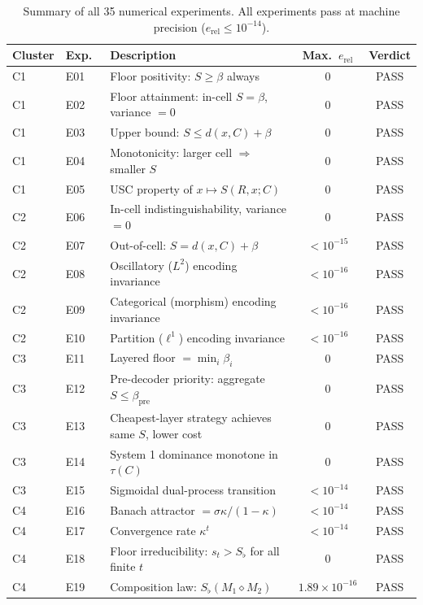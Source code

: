 \documentclass[twocolumn,11pt,a4paper]{article}
\newcommand{\Sfloor}{S_{\flat}}
\newcommand{\Compose}{\diamond}
\begin{document}
\begin{table}[!htbp]
\centering
\caption{Summary of all 35 numerical experiments.  All experiments
pass at machine precision ($e_{\mathrm{rel}}\leq 10^{-14}$).}
\label{tab:experiments}
\small
\begin{tabular}{@{}llp{5.8cm}cc@{}}
\toprule
Cluster & Exp.\ & Description &
Max.\ $e_{\mathrm{rel}}$ & Verdict \\
\midrule
C1 & E01 & Floor positivity: $S\geq\beta$ always & $0$ & PASS \\
C1 & E02 & Floor attainment: in-cell $S=\beta$, variance $=0$ & $0$ & PASS \\
C1 & E03 & Upper bound: $S\leq d(x,C)+\beta$ & $0$ & PASS \\
C1 & E04 & Monotonicity: larger cell $\Rightarrow$ smaller $S$ & $0$ & PASS \\
C1 & E05 & USC property of $x\mapsto S(R,x;C)$ & $0$ & PASS \\
\midrule
C2 & E06 & In-cell indistinguishability, variance $=0$ & $0$ & PASS \\
C2 & E07 & Out-of-cell: $S=d(x,C)+\beta$ & $<10^{-15}$ & PASS \\
C2 & E08 & Oscillatory ($L^2$) encoding invariance & $<10^{-16}$ & PASS \\
C2 & E09 & Categorical (morphism) encoding invariance & $<10^{-16}$ & PASS \\
C2 & E10 & Partition ($\ell^1$) encoding invariance & $<10^{-16}$ & PASS \\
\midrule
C3 & E11 & Layered floor $=\min_i\beta_i$ & $0$ & PASS \\
C3 & E12 & Pre-decoder priority: aggregate $S\leq\beta_{\text{pre}}$ & $0$ & PASS \\
C3 & E13 & Cheapest-layer strategy achieves same $S$, lower cost & $0$ & PASS \\
C3 & E14 & System 1 dominance monotone in $\tau(C)$ & $0$ & PASS \\
C3 & E15 & Sigmoidal dual-process transition & $<10^{-14}$ & PASS \\
\midrule
C4 & E16 & Banach attractor $=\sigma\kappa/(1-\kappa)$ & $<10^{-14}$ & PASS \\
C4 & E17 & Convergence rate $\kappa^t$ & $<10^{-14}$ & PASS \\
C4 & E18 & Floor irreducibility: $s_t>\Sfloor$ for all finite $t$ & $0$ & PASS \\
C4 & E19 & Composition law: $\Sfloor(M_1\Compose M_2)$ & $1.89\times10^{-16}$ & PASS \\

\end{tabular}
\end{table}
\end{document}

